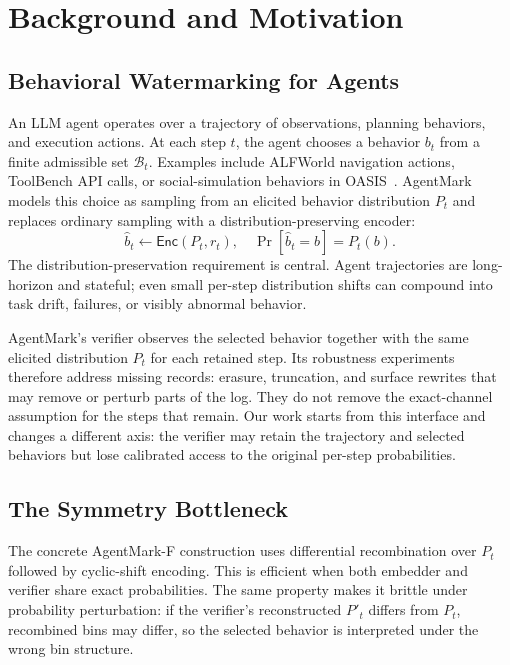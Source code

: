\documentclass[conference,compsoc]{IEEEtran}
\newcommand{\agentmark}{AgentMark-F}
\newcommand{\Enc}{\ensuremath{\mathsf{Enc}}}
\newcommand{\B}{\mathcal{B}}
\begin{document}
\section{Background and Motivation}
\label{sec:background}

\subsection{Behavioral Watermarking for Agents}

An LLM agent operates over a trajectory of observations, planning behaviors, and execution actions. At each step $t$, the agent chooses a behavior $b_t$ from a finite admissible set $\B_t$. Examples include ALFWorld navigation actions, ToolBench API calls, or social-simulation behaviors in OASIS~\cite{gao2024oasis}. AgentMark models this choice as sampling from an elicited behavior distribution $P_t$ and replaces ordinary sampling with a distribution-preserving encoder:
\begin{equation}
  \hat b_t \leftarrow \Enc(P_t, r_t), \quad
  \Pr[\hat b_t=b]=P_t(b).
\end{equation}
The distribution-preservation requirement is central. Agent trajectories are long-horizon and stateful; even small per-step distribution shifts can compound into task drift, failures, or visibly abnormal behavior.

AgentMark's verifier observes the selected behavior together with the same elicited distribution $P_t$ for each retained step. Its robustness experiments therefore address missing records: erasure, truncation, and surface rewrites that may remove or perturb parts of the log. They do not remove the exact-channel assumption for the steps that remain. Our work starts from this interface and changes a different axis: the verifier may retain the trajectory and selected behaviors but lose calibrated access to the original per-step probabilities.

\subsection{The Symmetry Bottleneck}

The concrete \agentmark{} construction uses differential recombination over $P_t$ followed by cyclic-shift encoding. This is efficient when both embedder and verifier share exact probabilities. The same property makes it brittle under probability perturbation: if the verifier's reconstructed $P'_t$ differs from $P_t$, recombined bins may differ, so the selected behavior is interpreted under the wrong bin structure.
\end{document}
